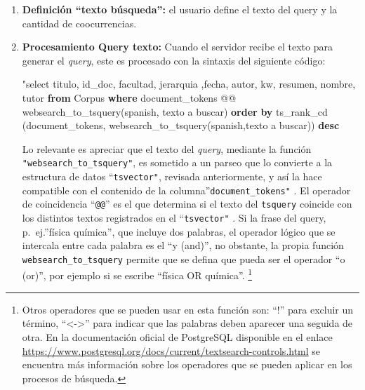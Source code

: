 \documentclass[
  12pt,
  openany]{book}
\newenvironment{Shaded}{\begin{snugshade}}{\end{snugshade}}
\newcommand{\KeywordTok}[1]{\textcolor[rgb]{0.13,0.29,0.53}{\textbf{#1}}}
\newcommand{\NormalTok}[1]{#1}
\newcommand{\OtherTok}[1]{\textcolor[rgb]{0.56,0.35,0.01}{#1}}
\newcommand{\StringTok}[1]{\textcolor[rgb]{0.31,0.60,0.02}{#1}}
\begin{document}
\begin{enumerate}
\def\labelenumi{\arabic{enumi}.}
\item
  \textbf{Definición ``texto búsqueda'':} el usuario define el texto del query y la cantidad de coocurrencias.
\item
  \textbf{Procesamiento Query texto:} Cuando el servidor recibe el texto para generar el \emph{query}, este es procesado con la sintaxis del siguiente código:

\begin{Shaded}
\begin{Highlighting}[]
\OtherTok{"select titulo, id\_doc, facultad, jerarquia ,fecha,}
\NormalTok{  autor, kw, resumen, nombre, tutor }\KeywordTok{from}\NormalTok{ Corpus }\KeywordTok{where}
\NormalTok{  document\_tokens @@ websearch\_to\_tsquery(}\StringTok{\textquotesingle{}spanish\textquotesingle{}}\NormalTok{,}
    \StringTok{\textquotesingle{}texto a buscar\textquotesingle{}}\NormalTok{) }
  \KeywordTok{order} \KeywordTok{by}\NormalTok{ ts\_rank\_cd (document\_tokens,}
\NormalTok{    websearch\_to\_tsquery(}\StringTok{\textquotesingle{}spanish\textquotesingle{}}\NormalTok{,}\StringTok{\textquotesingle{}texto a buscar\textquotesingle{}}\NormalTok{)) }\KeywordTok{desc}
\end{Highlighting}
\end{Shaded}

  Lo relevante es apreciar que el texto del \emph{query}, mediante la función \texttt{"websearch\_to\_tsquery"}, es sometido a un parseo que lo convierte a la estructura de datos ``\texttt{tsvector"}, revisada anteriormente, y así la hace compatible con el contenido de la columna''\texttt{document\_tokens"} . El operador de coincidencia ``\texttt{@@}'' es el que determina si el texto del \texttt{tsquery} coincide con los distintos textos registrados en el ``\texttt{tsvector"} . Si la frase del query, p.~ej.''física química'', que incluye dos palabras, el operador lógico que se intercala entre cada palabra es el ``y (and)'', no obstante, la propia función \texttt{websearch\_to\_tsquery} permite que se defina que pueda ser el operador ``o (or)'', por ejemplo si se escribe ``física OR química''. \footnote{Otros operadores que se pueden usar en esta función son: ``!'' para excluir un término, ``\textless-\textgreater{}'' para indicar que las palabras deben aparecer una seguida de otra. En la documentación oficial de PostgreSQL disponible en el enlace \url{https://www.postgresql.org/docs/current/textsearch-controls.html} se encuentra más información sobre los operadores que se pueden aplicar en los procesos de búsqueda.}


\end{enumerate}
\end{document}
